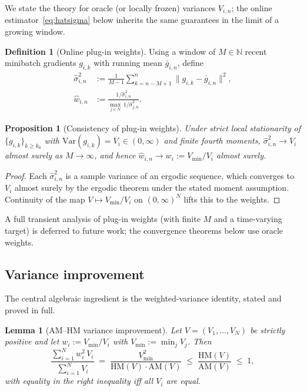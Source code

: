 \documentclass{article}
\theoremstyle{plain}
\newtheorem{proposition}[theorem]{Proposition}
\newtheorem{lemma}[theorem]{Lemma}
\theoremstyle{definition}
\newtheorem{definition}[theorem]{Definition}
\theoremstyle{remark}
\newcommand{\HM}{\mathrm{HM}}
\newcommand{\AM}{\mathrm{AM}}
\newcommand{\Var}{\mathrm{Var}}
\begin{document}
We state the theory for oracle (or locally frozen) variances $V_{i,n}$; the online estimator~\eqref{eq:hatsigma} below inherits the same guarantees in the limit of a growing window.

\begin{definition}[Online plug-in weights]\label{def:plugin}
Using a window of $M\in\mathbb{N}$ recent minibatch gradients $g_{i,k}$ with running mean $\bar g_{i,n}$, define
\begin{equation}\label{eq:hatsigma}
\begin{aligned}
\hat\sigma^2_{i,n}
&:= \frac{1}{M-1}\sum_{k=n-M+1}^{n}\|g_{i,k}-\bar g_{i,n}\|^2,\\
\hat w_{i,n}
&:= \frac{1/\hat\sigma^2_{i,n}}
{\max_{j\in N}\,1/\hat\sigma^2_{j,n}}.
\end{aligned}
\end{equation}
\end{definition}

\begin{proposition}[Consistency of plug-in weights]\label{prop:plugin}
Under strict local stationarity of $\{g_{i,k}\}_{k\ge k_0}$ with $\Var(g_{i,k})=V_i\in(0,\infty)$ and finite fourth moments, $\hat\sigma^2_{i,n}\to V_i$ almost surely as $M\to\infty$, and hence $\hat w_{i,n}\to w_i := V_{\min}/V_i$ almost surely.
\end{proposition}

\begin{proof}
Each $\hat\sigma^2_{i,n}$ is a sample variance of an ergodic sequence, which converges to $V_i$ almost surely by the ergodic theorem under the stated moment assumption. Continuity of the map $V\mapsto V_{\min}/V_i$ on $(0,\infty)^N$ lifts this to the weights.
\end{proof}

A full transient analysis of plug-in weights (with finite $M$ and a time-varying target) is deferred to future work; the convergence theorems below use oracle weights.

\subsection{Variance improvement}

The central algebraic ingredient is the weighted-variance identity, stated and proved in full.

\begin{lemma}[AM--HM variance improvement]\label{lem:amhm}
Let $V=(V_1,\ldots,V_N)$ be strictly positive and let $w_i := V_{\min}/V_i$ with $V_{\min} := \min_j V_j$. Then
\begin{equation}\label{eq:amhm-ratio}
\frac{\sum_{i=1}^N w_i^2\,V_i}{\sum_{i=1}^N V_i} \;=\; \frac{V_{\min}^2}{\HM(V)\cdot\AM(V)} \;\le\; \frac{\HM(V)}{\AM(V)} \;\le\; 1,
\end{equation}
with equality in the right inequality iff all $V_i$ are equal.
\end{lemma}
\end{document}

